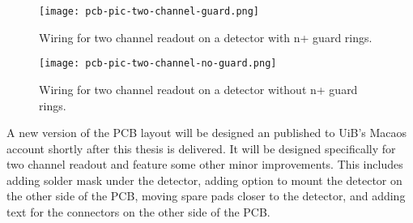 \documentclass[../main/thesis.tex]{subfiles}
\begin{document}
\begin{figure}%
	\centering
	\texttt{[image: pcb-pic-two-channel-guard.png]}
	\caption{Wiring for two channel readout on a detector with n+ guard rings.}
	\label{fig-wiring-2-g} 
\end{figure}

\begin{figure}%
	\centering
	\texttt{[image: pcb-pic-two-channel-no-guard.png]}
	\caption{Wiring for two channel readout on a detector without n+ guard rings.}
	\label{fig-wiring-2} 
\end{figure}

A new version of the PCB layout will be designed an published to UiB's Macaos account shortly after this thesis is delivered. It will be designed specifically for two channel readout and feature some other minor improvements. This includes adding solder mask under the detector, adding option to mount the detector on the other side of the PCB, moving spare pads closer to the detector, and adding text for the connectors on the other side of the PCB. 

\end{document}
